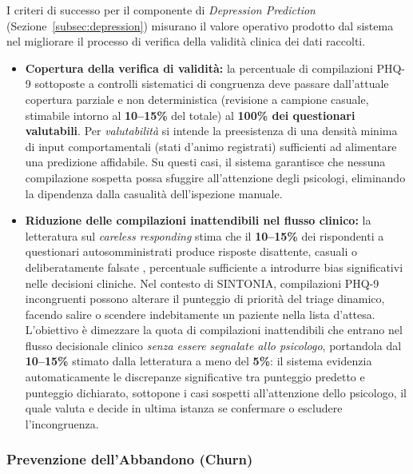 I criteri di successo per il componente di \textit{Depression Prediction} (Sezione~\ref{subsec:depression}) misurano il valore operativo prodotto dal sistema nel migliorare il processo di verifica della validità clinica dei dati raccolti.

\begin{itemize}
    \item \textbf{Copertura della verifica di validità:} la percentuale di compilazioni PHQ-9 sottoposte a controlli sistematici di congruenza deve passare dall'attuale copertura parziale e non deterministica (revisione a campione casuale, stimabile intorno al \textbf{10--15\%} del totale) al \textbf{100\% dei questionari valutabili}. Per \textit{valutabilità} si intende la preesistenza di una densità minima di input comportamentali (stati d'animo registrati) sufficienti ad alimentare una predizione affidabile. Su questi casi, il sistema garantisce che nessuna compilazione sospetta possa sfuggire all'attenzione degli psicologi, eliminando la dipendenza dalla casualità dell'ispezione manuale.

    \item \textbf{Riduzione delle compilazioni inattendibili nel flusso clinico:} la letteratura sul \textit{careless responding} stima che il \textbf{10--15\%} dei rispondenti a questionari autosomministrati produce risposte disattente, casuali o deliberatamente falsate \cite{meade2012careless}, percentuale sufficiente a introdurre bias significativi nelle decisioni cliniche. Nel contesto di SINTONIA, compilazioni PHQ-9 incongruenti possono alterare il punteggio di priorità del triage dinamico, facendo salire o scendere indebitamente un paziente nella lista d'attesa. L'obiettivo è dimezzare la quota di compilazioni inattendibili che entrano nel flusso decisionale clinico \textit{senza essere segnalate allo psicologo}, portandola dal \textbf{10--15\%} stimato dalla letteratura a meno del \textbf{5\%}: il sistema evidenzia automaticamente le discrepanze significative tra punteggio predetto e punteggio dichiarato, sottopone i casi sospetti all'attenzione dello psicologo, il quale valuta e decide in ultima istanza se confermare o escludere l'incongruenza.
\end{itemize}

\subsubsection{Prevenzione dell'Abbandono (Churn)}
\label{subsubsec:kpi_churn}

